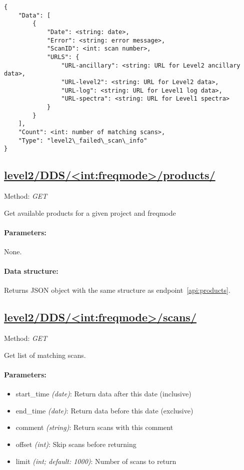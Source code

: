 \begin{lstlisting}
{
	"Data": [
		{
			"Date": <string: date>,
			"Error": <string: error message>,
			"ScanID": <int: scan number>,
			"URLS": {
				"URL-ancillary": <string: URL for Level2 ancillary data>,
				"URL-level2": <string: URL for Level2 data>,
				"URL-log": <string: URL for Level1 log data>,
				"URL-spectra": <string: URL for Level1 spectra>
			}
		}
	],
	"Count": <int: number of matching scans>,
	"Type": "level2\_failed\_scan\_info"
}
\end{lstlisting}


\subsection{\url{level2/DDS/<int:freqmode>/products/}}
Method: \emph{GET}

Get available products for a given project and freqmode

\paragraph{Parameters:} None.

\paragraph{Data structure:}
Returns JSON object with the same structure as endpoint~\ref{api:products}.


\subsection{\url{level2/DDS/<int:freqmode>/scans/}}
Method: \emph{GET}

Get list of matching scans.

\paragraph{Parameters:}
\begin{itemize}
    \item start\_time \emph{(date)}: Return data after this date (inclusive)
    \item end\_time \emph{(date)}: Return data before this date (exclusive)
	\item comment \emph{(string)}: Return scans with this comment
	\item offset \emph{(int)}: Skip scans before returning
	\item limit \emph{(int; default: 1000)}: Number of scans to return
\end{itemize}

